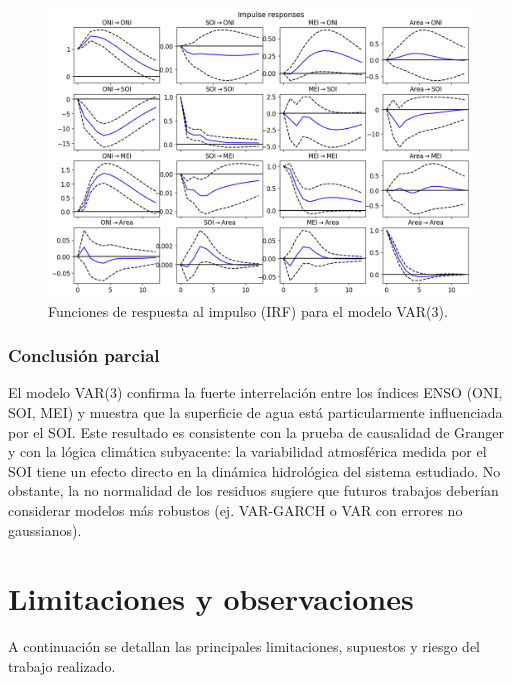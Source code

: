 \begin{figure}[H]
    \centering
    \includegraphics[scale=0.45]{Figures/var_ir.png}
    \caption{Funciones de respuesta al impulso (IRF) para el modelo VAR(3).}
    \label{fig:var_irf}
\end{figure}

\subsubsection{Conclusión parcial}
El modelo VAR(3) confirma la fuerte interrelación entre los índices ENSO (ONI, SOI, MEI) y muestra que la superficie de agua está particularmente influenciada por el SOI. Este resultado es consistente con la prueba de causalidad de Granger y con la lógica climática subyacente: la variabilidad atmosférica medida por el SOI tiene un efecto directo en la dinámica hidrológica del sistema estudiado. No obstante, la no normalidad de los residuos sugiere que futuros trabajos deberían considerar modelos más robustos (ej. VAR-GARCH o VAR con errores no gaussianos).

\section{Limitaciones y observaciones}
A continuación se detallan las principales limitaciones,  supuestos y riesgo del trabajo realizado.

